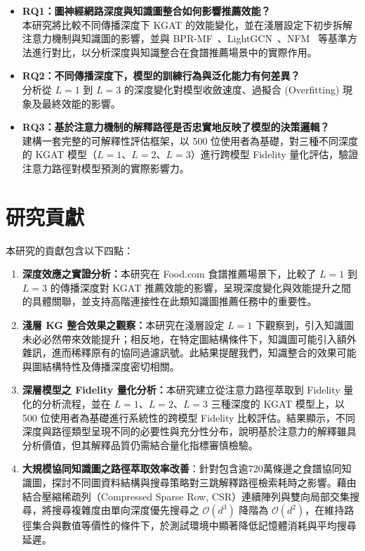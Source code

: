 \begin{itemize}[leftmargin=2em]
  \item \textbf{RQ1：圖神經網路深度與知識圖整合如何影響推薦效能？} \\
  本研究將比較不同傳播深度下 KGAT 的效能變化，並在淺層設定下初步拆解注意力機制與知識圖的影響，並與 BPR-MF~\cite{rendle2009bpr}、LightGCN~\cite{he2020lightgcn}、NFM~\cite{he2017nfm} 等基準方法進行對比，以分析深度與知識整合在食譜推薦場景中的實際作用。
  \item \textbf{RQ2：不同傳播深度下，模型的訓練行為與泛化能力有何差異？} \\
    分析從 $L{=}1$ 到 $L{=}3$ 的深度變化對模型收斂速度、過擬合 (Overfitting) 現象及最終效能的影響。
  \item \textbf{RQ3：基於注意力機制的解釋路徑是否忠實地反映了模型的決策邏輯？} \\
    建構一套完整的可解釋性評估框架，以 500 位使用者為基礎，對三種不同深度的 KGAT 模型（$L{=}1$、$L{=}2$、$L{=}3$）進行跨模型 Fidelity 量化評估，驗證注意力路徑對模型預測的實際影響力。
\end{itemize}

\section{研究貢獻}

本研究的貢獻包含以下四點：

\begin{enumerate}[leftmargin=2em]
  \item \textbf{深度效應之實證分析：}本研究在 Food.com 食譜推薦場景下，比較了 $L{=}1$ 到 $L{=}3$ 的傳播深度對 KGAT 推薦效能的影響，呈現深度變化與效能提升之間的具體關聯，並支持高階連接性在此類知識圖推薦任務中的重要性。
  \item \textbf{淺層 KG 整合效果之觀察：}本研究在淺層設定 $L{=}1$ 下觀察到，引入知識圖未必必然帶來效能提升；相反地，在特定圖結構條件下，知識圖可能引入額外雜訊，進而稀釋原有的協同過濾訊號。此結果提醒我們，知識整合的效果可能與圖結構特性及傳播深度密切相關。
  \item \textbf{深層模型之 Fidelity 量化分析：}本研究建立從注意力路徑萃取到 Fidelity 量化的分析流程，並在 $L{=}1$、$L{=}2$、$L{=}3$ 三種深度的 KGAT 模型上，以 500 位使用者為基礎進行系統性的跨模型 Fidelity 比較評估。結果顯示，不同深度與路徑類型呈現不同的必要性與充分性分布，說明基於注意力的解釋雖具分析價值，但其解釋品質仍需結合量化指標審慎檢驗。
  \item \textbf{大規模協同知識圖之路徑萃取效率改善}：針對包含逾720萬條邊之食譜協同知識圖，探討不同圖資料結構與搜尋策略對三跳解釋路徑檢索耗時之影響。藉由結合壓縮稀疏列（Compressed Sparse Row, CSR）連續陣列與雙向局部交集搜尋，將搜尋複雜度由單向深度優先搜尋之 $\mathcal{O}(d^3)$ 降階為 $\mathcal{O}(d^2)$，在維持路徑集合與數值等價性的條件下，於測試環境中顯著降低記憶體消耗與平均搜尋延遲。
\end{enumerate}

